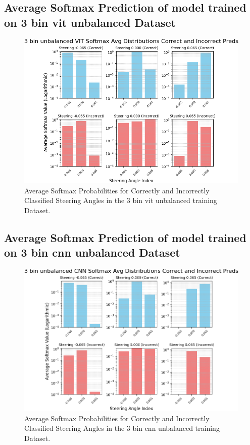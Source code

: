 
\subsection{Average Softmax Prediction of model trained on 3 bin vit unbalanced Dataset}

\begin{figure}[H]
    \centering
    \includegraphics[width=1\linewidth]{Figures/Results/3_bins_vit_softmax_dist_plot_unbalanced.png}
    \caption{Average Softmax Probabilities for Correctly and Incorrectly Classified Steering Angles in the 3 bin vit unbalanced training Dataset.}
    \label{fig:3_bins_vit_softmax_dist_unbalanced}
\end{figure}


\subsection{Average Softmax Prediction of model trained on 3 bin cnn unbalanced Dataset}

\begin{figure}[H]
    \centering
    \includegraphics[width=1\linewidth]{Figures/Results/3_bins_cnn_softmax_dist_plot_unbalanced.png}
    \caption{Average Softmax Probabilities for Correctly and Incorrectly Classified Steering Angles in the 3 bin cnn unbalanced training Dataset.}
    \label{fig:3_bins_cnn_softmax_dist_unbalanced}
\end{figure}

